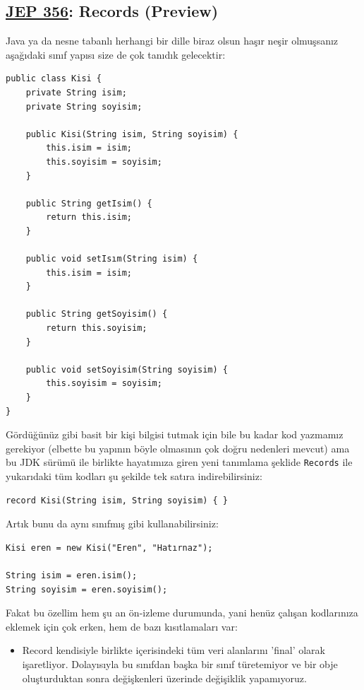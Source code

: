 \documentclass[11pt]{article}
\begin{document}
\subsection{\href{https://openjdk.java.net/jeps/359}{JEP 356}: Records (Preview)}
\label{sec:org7aecd4f}
Java ya da nesne tabanlı herhangi bir dille biraz olsun haşır neşir
olmuşsanız aşağıdaki sınıf yapısı size de çok tanıdık gelecektir:
\begin{verbatim}
public class Kisi {
    private String isim;
    private String soyisim;

    public Kisi(String isim, String soyisim) {
        this.isim = isim;
        this.soyisim = soyisim;
    }

    public String getIsim() {
        return this.isim;
    }

    public void setIsım(String isim) {
        this.isim = isim;
    }

    public String getSoyisim() {
        return this.soyisim;
    }

    public void setSoyisim(String soyisim) {
        this.soyisim = soyisim;
    }
}
\end{verbatim}
Gördüğünüz gibi basit bir kişi bilgisi tutmak için bile bu kadar kod yazmamız
gerekiyor (elbette bu yapının böyle olmasının çok doğru nedenleri mevcut) ama
bu JDK sürümü ile birlikte hayatımıza giren yeni tanımlama şeklide \texttt{Records}
ile yukarıdaki tüm kodları şu şekilde tek satıra indirebilirsiniz:
\begin{verbatim}
record Kisi(String isim, String soyisim) { }
\end{verbatim}
Artık bunu da aynı sınıfmış gibi kullanabilirsiniz:
\begin{verbatim}
Kisi eren = new Kisi("Eren", "Hatırnaz");

String isim = eren.isim();
String soyisim = eren.soyisim();
\end{verbatim}
Fakat bu özellim hem şu an ön-izleme durumunda, yani henüz çalışan
kodlarınıza eklemek için çok erken, hem de bazı kısıtlamaları var:
\begin{itemize}
\item Record kendisiyle birlikte içerisindeki tüm veri alanlarını 'final' olarak
işaretliyor. Dolayısıyla bu sınıfdan başka bir sınıf türetemiyor ve bir
obje oluşturduktan sonra değişkenleri üzerinde değişiklik yapamıyoruz.
\end{itemize}
\end{document}
